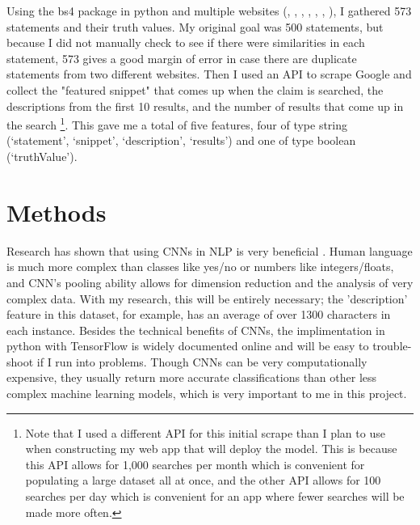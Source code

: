 \documentclass[]{article}
\begin{document}
			
		Using the bs4 package in python and multiple websites (\cite{tf1}, \cite{tf2}, \cite{tf3}, \cite{tf4}, \cite{tf5}, \cite{tf6}, \cite{tf7}), I gathered 573 statements and their truth values. My original goal was 500 statements, but because I did not manually check to see if there were similarities in each statement, 573 gives a good margin of error in case there are duplicate statements from two different websites. Then I used an API to scrape Google and collect the "featured snippet" that comes up when the claim is searched, the descriptions from the first 10 results, and the number of results that come up in the search \cite{a_api} \footnote{Note that I used a different API for this initial scrape than I plan to use when constructing my web app that will deploy the model. This is because this API allows for 1,000 searches per month which is convenient for populating a large dataset all at once, and the other API allows for 100 searches per day which is convenient for an app where fewer searches will be made more often.}. This gave me a total of five features, four of type string (`statement', `snippet', `description', `results') and one of type boolean (`truthValue').
		
	\section{Methods}
		
		
		
		Research has shown that using CNNs in NLP is very beneficial \cite{kim14}. Human language is much more complex than classes like yes/no or numbers like integers/floats, and CNN's pooling ability allows for dimension reduction and the analysis of very complex data. With my research, this will be entirely necessary; the 'description' feature in this dataset, for example, has an average of over 1300 characters in each instance. Besides the technical benefits of CNNs, the implimentation in python with TensorFlow is widely documented online and will be easy to trouble-shoot if I run into problems. Though CNNs can be very computationally expensive, they usually return more accurate classifications than other less complex machine learning models, which is very important to me in this project.
		
\end{document}
